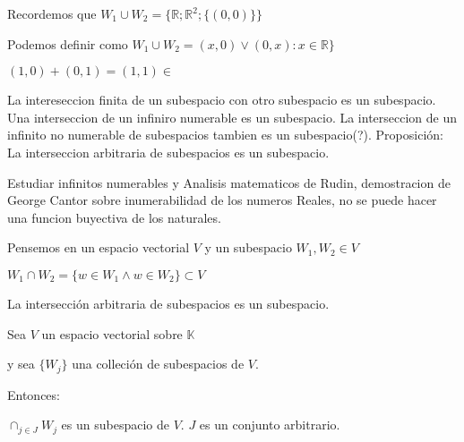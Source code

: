 Recordemos que $W_1 \cup W_2= \{ \mathbb{R};\mathbb{R}^2;\{(0,0)\}\}$

Podemos definir como $W_1 \cup W_2= (x,0) \lor (0,x) : x\in\mathbb{R}\}$

$(1,0)+(0,1) = (1,1)  \in$

La intereseccion finita de un subespacio con otro subespacio es un subespacio. Una interseccion de un infiniro numerable es un subespacio. La interseccion de un infinito no numerable de subespacios tambien es un subespacio(?). Proposici\'{o}n: La interseccion arbitraria de subespacios es un subespacio.

\begin{nota}

Estudiar infinitos numerables y Analisis matematicos de Rudin, demostracion de George Cantor sobre inumerabilidad de los numeros Reales, no se puede hacer una funcion buyectiva de los naturales.
\end{nota}



\begin{propo}



Pensemos en un espacio vectorial $V$ y un subespacio $W_1,W_2 \in V$

$W_1 \cap W_2 = \{w\in W_1  \land w \in W_2\}\subset V$
\end{propo}

\begin{propo}
La intersecci\'{o}n  arbitraria de subespacios es un subespacio.

Sea $V$ un espacio vectorial sobre $\mathbb{K}$

y sea $\{W_j\}$ una colleci\'{o}n de subespacios de $V$.

Entonces:

$\cap_{j\in J} W_j$ es un subespacio de $V$. $J$ es un conjunto arbitrario.

\end{propo}


